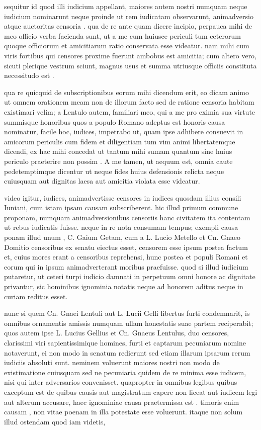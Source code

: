  sequitur id quod illi iudicium appellant, maiores autem nostri numquam neque iudicium nominarunt neque proinde ut rem iudicatam observarunt, animadversio atque auctoritas censoria . qua de re ante quam dicere incipio, perpauca mihi de meo officio verba facienda sunt, ut a me cum huiusce periculi tum ceterorum quoque officiorum et amicitiarum ratio conservata esse videatur. nam mihi cum viris fortibus qui censores proxime fuerunt ambobus est amicitia; cum altero vero, sicuti plerique vestrum sciunt, magnus usus et summa utriusque officiis constituta necessitudo est .

 qua re quicquid de subscriptionibus eorum mihi dicendum erit, eo dicam animo ut omnem orationem meam non de illorum facto sed de ratione censoria habitam existimari velim; a Lentulo autem, familiari meo, qui a me pro eximia sua virtute summisque honoribus quos a populo Romano adeptus est honoris causa nominatur, facile hoc, iudices, impetrabo ut, quam ipse adhibere consuevit in amicorum periculis cum fidem et diligentiam tum vim animi libertatemque dicendi, ex hac mihi concedat ut tantum mihi sumam quantum sine huius periculo praeterire non possim . A me tamen, ut aequum est, omnia caute pedetemptimque dicentur ut neque fides huius defensionis relicta neque cuiusquam aut dignitas laesa aut amicitia violata esse videatur.

 video igitur, iudices, animadvertisse censores in iudices quosdam illius consili Iuniani, cum istam ipsam causam subscriberent. hic illud primum commune proponam, numquam animadversionibus censoriis hanc civitatem ita contentam ut rebus iudicatis fuisse. neque in re nota consumam tempus; exempli causa ponam illud unum , C. Gaium Getam, cum a L. Lucio Metello et Cn. Gnaeo Domitio censoribus ex senatu eiectus esset, censorem esse ipsum postea factum et, cuius mores erant a censoribus reprehensi, hunc postea et populi Romani et eorum qui in ipsum animadverterant moribus praefuisse. quod si illud iudicium putaretur, ut ceteri turpi iudicio damnati in perpetuum omni honore ac dignitate privantur, sic hominibus ignominia notatis neque ad honorem aditus neque in curiam reditus esset.

 nunc si quem Cn. Gnaei Lentuli aut L. Lucii Gelli libertus furti condemnarit, is omnibus ornamentis amissis numquam ullam honestatis suae partem reciperabit; quos autem ipse L. Lucius Gellius et Cn. Gnaeus Lentulus, duo censores, clarissimi viri sapientissimique homines, furti et captarum pecuniarum nomine notaverunt, ei non modo in senatum redierunt sed etiam illarum ipsarum rerum iudiciis absoluti sunt. neminem voluerunt maiores nostri non modo de existimatione cuiusquam sed ne pecuniaria quidem de re minima esse iudicem, nisi qui inter adversarios convenisset. quapropter in omnibus legibus quibus exceptum est de quibus causis aut magistratum capere non liceat aut iudicem legi aut alterum accusare, haec ignominiae causa praetermissa est . timoris enim causam , non vitae poenam in illa potestate esse voluerunt. itaque non solum illud ostendam quod iam videtis,

